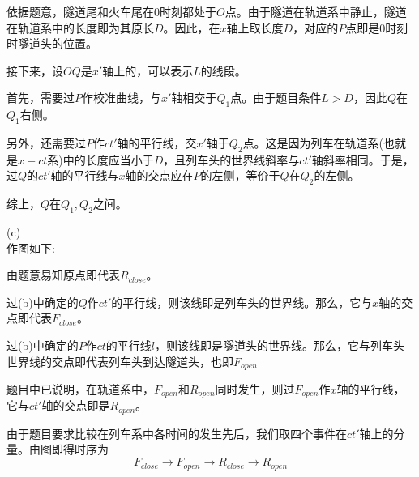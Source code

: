 \begin{solution}
    依据题意，隧道尾和火车尾在$0$时刻都处于$O$点。由于隧道在轨道系中静止，隧道在轨道系中的长度即为其原长$D$。因此，在$x$轴上取长度$D$，对应的$P$点即是$0$时刻时隧道头的位置。

    接下来，设$OQ$是$x'$轴上的，可以表示$L$的线段。

    首先，需要过$P$作校准曲线，与$x'$轴相交于$Q_1$点。由于题目条件$L>D$，因此$Q$在$Q_1$右侧。

    另外，还需要过$P$作$ct'$轴的平行线，交$x'$轴于$Q_2$点。这是因为列车在轨道系(也就是$x-ct$系)中的长度应当小于$D$，且列车头的世界线斜率与$ct'$轴斜率相同。于是，过$Q$的$ct'$轴的平行线与$x$轴的交点应在$P$的左侧，等价于$Q$在$Q_2$的左侧。

    综上，$Q$在$Q_1,Q_2$之间。

    (c)\\
    作图如下:
    \begin{center}
    \end{center}

    由题意易知原点即代表$R_{close}$。

    过(b)中确定的$Q$作$ct'$的平行线，则该线即是列车头的世界线。那么，它与$x$轴的交点即代表$F_{close}$。

    过(b)中确定的$P$作$ct$的平行线$l$，则该线即是隧道头的世界线。那么，它与列车头世界线的交点即代表列车头到达隧道头，也即$F_{open}$

    题目中已说明，在轨道系中，$F_{open}$和$R_{open}$同时发生，则过$F_{open}$作$x$轴的平行线，它与$ct'$轴的交点即是$R_{open}$。

    由于题目要求比较在列车系中各时间的发生先后，我们取四个事件在$ct'$轴上的分量。由图即得时序为
    \[F_{close}\rightarrow F_{open}\rightarrow R_{close}\rightarrow R_{open}\]
\end{solution}


